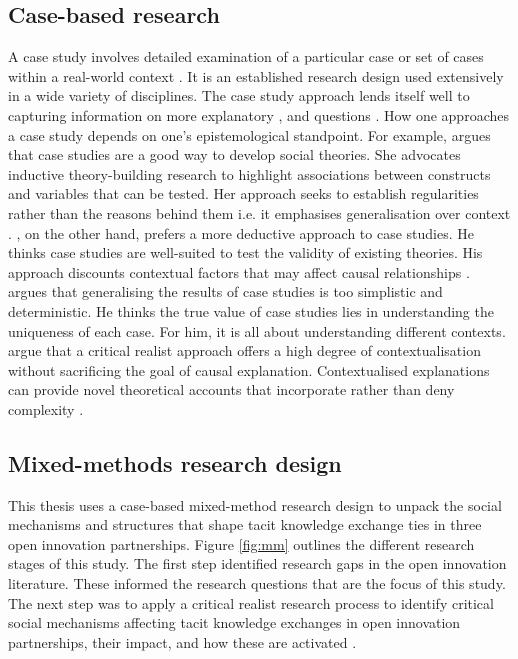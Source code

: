 \subsection{Case-based research}

A case study involves detailed examination of a particular case or set of cases within a real-world context \citep{crowe2011case}. It is an established research design used extensively in a wide variety of disciplines. The case study approach lends itself well to capturing information on more explanatory ,  and  questions \citep{crowe2011case}. How one approaches a case study depends on one's epistemological standpoint. For example, \citet{eisenhardt1989building} argues that case studies are a good way to develop social theories. She advocates inductive theory-building research to highlight associations between constructs and variables that can be tested. Her approach seeks to establish regularities rather than the reasons behind them i.e. it emphasises generalisation over context \citep{welch2011theorising}. \citet{yin2009case}, on the other hand, prefers a more deductive approach to case studies. He thinks case studies are well-suited to test the validity of existing theories. His approach discounts contextual factors that may affect causal relationships \citep{welch2011theorising}. \citet{stake2005qualitative} argues that generalising the results of case studies is too simplistic and deterministic. He thinks the true value of case studies lies in understanding the uniqueness of each case. For him, it is all about understanding different contexts. \citet{welch2011theorising} argue that a critical realist approach offers a high degree of contextualisation without sacrificing the goal of causal explanation. Contextualised explanations can provide novel theoretical accounts that incorporate rather than deny complexity \citep{ragin2009reflections}. \medskip

\subsection{Mixed-methods research design}

This thesis uses a case-based mixed-method research design to unpack the social mechanisms and structures that shape tacit knowledge exchange ties in three open innovation partnerships. Figure \ref{fig:mm} outlines the different research stages of this study. The first step identified research gaps in the open innovation literature. These informed the research questions that are the focus of this study. The next step was to apply a critical realist research process to identify critical social mechanisms affecting tacit knowledge exchanges in open innovation partnerships, their impact, and how these are activated \citep{mcavoy2018critical}. \medskip

